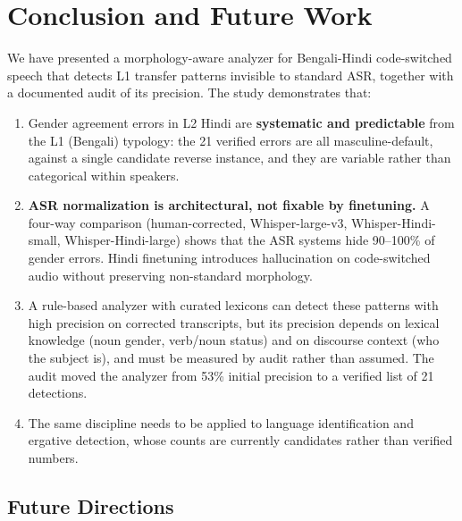 \documentclass[11pt,a4paper]{report}
\begin{document}
\chapter{Conclusion and Future Work}
\label{sec:conclusion}

We have presented a morphology-aware analyzer for Bengali-Hindi code-switched speech that detects L1 transfer patterns invisible to standard ASR, together with a documented audit of its precision. The study demonstrates that:

\begin{enumerate}
  \item Gender agreement errors in L2 Hindi are \textbf{systematic and predictable} from the L1 (Bengali) typology: the 21 verified errors are all masculine-default, against a single candidate reverse instance, and they are variable rather than categorical within speakers.
  \item \textbf{ASR normalization is architectural, not fixable by finetuning.} A four-way comparison (human-corrected, Whisper-large-v3, Whisper-Hindi-small, Whisper-Hindi-large) shows that the ASR systems hide 90--100\% of gender errors. Hindi finetuning introduces hallucination on code-switched audio without preserving non-standard morphology.
  \item A rule-based analyzer with curated lexicons can detect these patterns with high precision on corrected transcripts, but its precision depends on lexical knowledge (noun gender, verb/noun status) and on discourse context (who the subject is), and must be measured by audit rather than assumed. The audit moved the analyzer from 53\% initial precision to a verified list of 21 detections.
  \item The same discipline needs to be applied to language identification and ergative detection, whose counts are currently candidates rather than verified numbers.
\end{enumerate}

\section{Future Directions}
\end{document}
